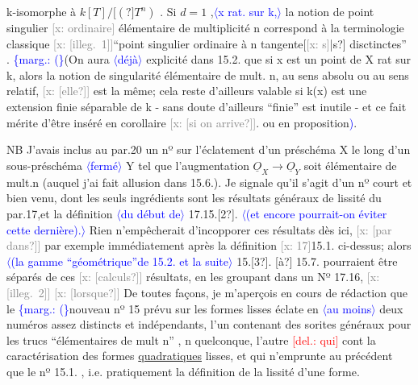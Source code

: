 \documentclass[11pt]{article}
\newcommand{\scanpage}[1]{\par\bigskip\noindent{\small\sffamily[scan #1]}\par}
\newcommand{\mspage}[1]{{\small\sffamily[p.\,#1]}}
\newcommand{\hand}[1]{\textcolor{blue}{#1}}
\let\over\relax
\newcommand{\over}[2]{\textcolor{gray}{#1}\textcolor{blue}{\ensuremath{^{\!\nearrow}}#2}}
\newcommand{\inserted}[2][]{\textcolor{blue}{$\langle$#2$\rangle$}}
\newcommand{\margin}[1]{\textcolor{blue}{\{\textsf{marg.:} #1\}}}
\newcommand{\deleted}[1]{\textcolor{red}{[\textsf{del.:} #1]}}
\newcommand{\xout}[1]{\textcolor{gray}{[\textsf{x:} #1]}}
\newcommand{\uline}[1]{\underline{#1}}
\newcommand{\unsure}[1]{[#1?]}
\newcommand{\illegible}[1]{[\textsf{illeg.\ #1}]}
\begin{document}
\mspage{\hand{163}}

\clearpage
\scanpage{25/164}
\mspage{7}

k-isomorphe à $k[T]/\unsure{(}T^n)$ . Si $d=1$ ,\inserted[typed]{x rat. sur k,} la notion de point singulier
\xout{ordinaire} élémentaire de multiplicité n correspond à la terminologie
classique \xout{\illegible{1}}``point singulier ordinaire à n tangente\unsure{\xout{s}|s} disctinctes'' .
\margin{(}(On aura \inserted{déjà} explicité dans 15.2. que si x est un point de X rat sur k, alors
la notion de singularité élémentaire de mult. n, au sens absolu ou au
sens relatif, \xout{\unsure{elle}} est la même; cela reste d'ailleurs valable si k(x)
est une extension finie séparable de k - sans doute d'ailleurs ``finie''
est inutile - et ce fait mérite d'être inséré en corollaire \xout{\unsure{si on arrive}}.
ou en proposition\hand{)}.

NB J'avais inclus au par.20 un nº sur l'éclatement d'un
préschéma X le long d'un sous-préschéma \inserted{fermé} Y tel que l'augmentation
$\underline{O}_X \longrightarrow \underline{O}_Y$ soit élémentaire de mult.n (auquel j'ai fait allusion dans
15.6.). Je signale qu'il s'agit d'un nº court et bien venu, dont les
seuls ingrédients sont les résultats généraux de lissité du par.17,et
la définition \inserted{du début de} 17.15.\unsure{2}. \inserted[typed]{(et encore pourrait-on éviter cette dernière).} Rien n'empêcherait d'incopporer ces résultats
dès ici, \xout{\unsure{par dans}} par exemple immédiatement après la définition
\xout{17}15.1. ci-dessus; alors \inserted[typed]{(la gamme ``géométrique''de 15.2. et la suite} 15.\unsure{3}. \unsure{à} 15.7. pourraient être séparés
de ces \xout{\unsure{calculs}} résultats, en les groupant dans un Nº 17.16, \xout{\illegible{2}}
\xout{\unsure{lorsque}} De toutes façons, je m'aperçois en cours de rédaction que le
\margin{(}nouveau nº 15 prévu sur les formes lisses éclate en \inserted{au moins} deux numéros assez
distincts et indépendants, l'un contenant des sorites généraux pour
les trucs ``élémentaires de mult n'' , n quelconque, l'autre \deleted{qui} cont\over{ient}{enant} la
caractérisation des formes \uline{quadratiques} lisses, et qui n'emprunte au
précédent que le nº 15.1. , i.e. pratiquement la définition de la lissité
d'une forme.
\end{document}
